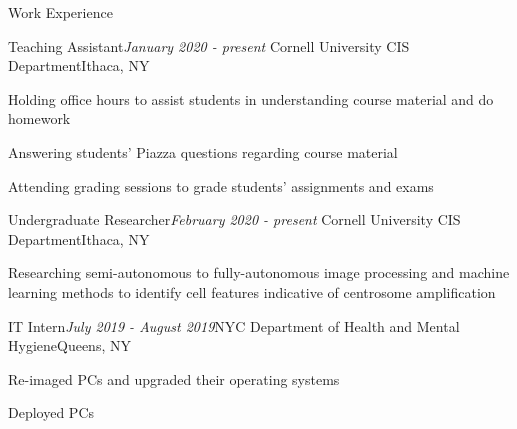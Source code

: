 \documentclass{resume} %
\begin{document}




%
%
%


\begin{rSection}{Work Experience}

\begin{rSubsection}{Teaching Assistant}{\em January 2020 - present }{Cornell University CIS Department}{Ithaca, NY}
\item Holding office hours to assist students in understanding course material and do homework
\item Answering students' Piazza questions regarding course material
\item Attending grading sessions to grade students' assignments and exams
\end{rSubsection}

\begin{rSubsection}{Undergraduate Researcher}{\em February 2020 - present }{Cornell University CIS Department}{Ithaca, NY}
\item Researching semi-autonomous to fully-autonomous image processing and machine learning methods to identify cell features indicative of centrosome amplification
\end{rSubsection}

\begin{rSubsection}{IT Intern}{\em July 2019 - August 2019}{NYC Department of Health and Mental Hygiene}{Queens, NY}
\item Re-imaged PCs and upgraded their operating systems
\item Deployed PCs
\end{rSubsection}

\end{rSection}
\end{document}
